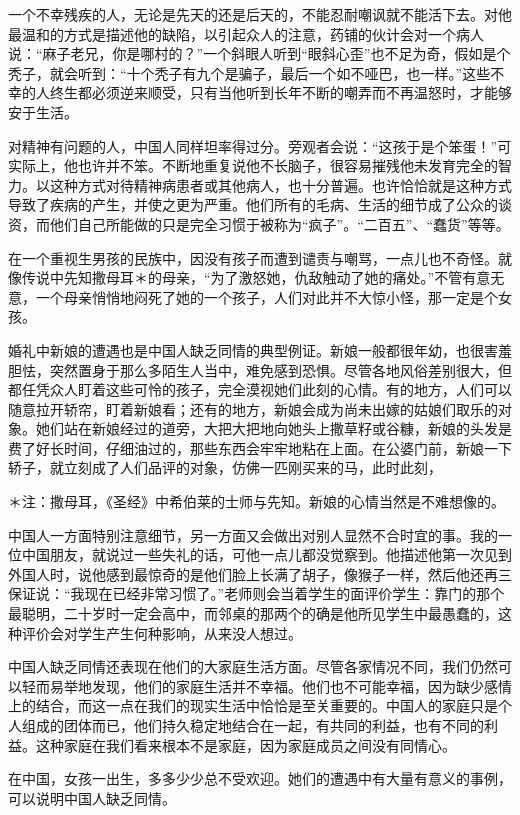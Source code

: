 \documentclass[12pt,oneside]{book}
\begin{document}
\begin{common-format}
一个不幸残疾的人，无论是先天的还是后天的，不能忍耐嘲讽就不能活下去。对他最温和的方式是描述他的缺陷，以引起众人的注意，药铺的伙计会对一个病人说：“麻子老兄，你是哪村的？”一个斜眼人听到“眼斜心歪”也不足为奇，假如是个秃子，就会听到：“十个秃子有九个是骗子，最后一个如不哑巴，也一样。”这些不幸的人终生都必须逆来顺受，只有当他听到长年不断的嘲弄而不再温怒时，才能够安于生活。 

对精神有问题的人，中国人同样坦率得过分。旁观者会说：“这孩于是个笨蛋！”可实际上，他也许并不笨。不断地重复说他不长脑子，很容易摧残他未发育完全的智力。以这种方式对待精神病患者或其他病人，也十分普遍。也许恰恰就是这种方式导致了疾病的产生，并使之更为严重。他们所有的毛病、生活的细节成了公众的谈资，而他们自己所能做的只是完全习惯于被称为“疯子”。“二百五”、“蠢货”等等。 

在一个重视生男孩的民族中，因没有孩子而遭到谴责与嘲骂，一点儿也不奇怪。就像传说中先知撒母耳＊的母亲，“为了激怒她，仇敌触动了她的痛处。”不管有意无意，一个母亲悄悄地闷死了她的一个孩子，人们对此并不大惊小怪，那一定是个女孩。 

婚礼中新娘的遭遇也是中国人缺乏同情的典型例证。新娘一般都很年幼，也很害羞胆怯，突然置身于那么多陌生人当中，难免感到恐惧。尽管各地风俗差别很大，但都任凭众人盯着这些可怜的孩子，完全漠视她们此刻的心情。有的地方，人们可以随意拉开轿帘，盯着新娘看；还有的地方，新娘会成为尚未出嫁的姑娘们取乐的对象。她们站在新娘经过的道旁，大把大把地向她头上撒草籽或谷糠，新娘的头发是费了好长时间，仔细油过的，那些东西会牢牢地粘在上面。在公婆门前，新娘一下轿子，就立刻成了人们品评的对象，仿佛一匹刚买来的马，此时此刻， 

＊注：撒母耳，《圣经》中希伯莱的士师与先知。新娘的心情当然是不难想像的。 

中国人一方面特别注意细节，另一方面又会做出对别人显然不合时宜的事。我的一位中国朋友，就说过一些失礼的话，可他一点儿都没觉察到。他描述他第一次见到外国人时，说他感到最惊奇的是他们脸上长满了胡子，像猴子一样，然后他还再三保证说：“我现在已经非常习惯了。”老师则会当着学生的面评价学生：靠门的那个最聪明，二十岁时一定会高中，而邻桌的那两个的确是他所见学生中最愚蠢的，这种评价会对学生产生何种影响，从来没人想过。 

中国人缺乏同情还表现在他们的大家庭生活方面。尽管各家情况不同，我们仍然可以轻而易举地发现，他们的家庭生活并不幸福。他们也不可能幸福，因为缺少感情上的结合，而这一点在我们的现实生活中恰恰是至关重要的。中国人的家庭只是个人组成的团体而已，他们持久稳定地结合在一起，有共同的利益，也有不同的利益。这种家庭在我们看来根本不是家庭，因为家庭成员之间没有同情心。 

在中国，女孩一出生，多多少少总不受欢迎。她们的遭遇中有大量有意义的事例，可以说明中国人缺乏同情。 


\end{common-format}
\end{document}
